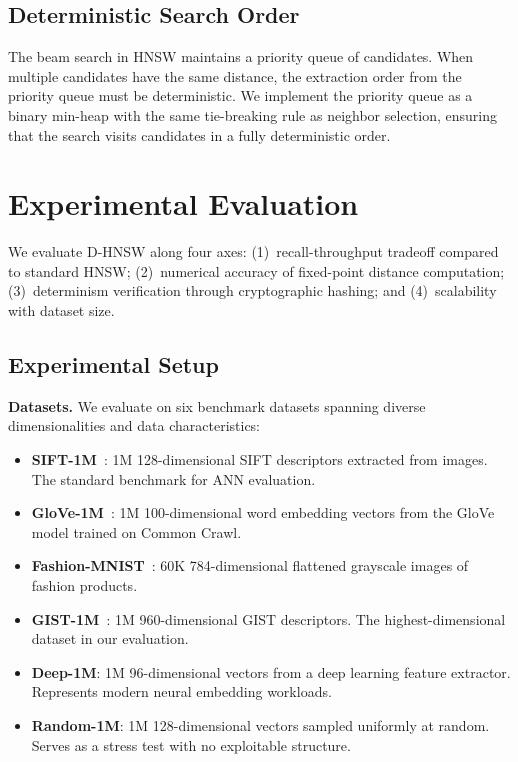 \documentclass[10pt,journal,compsoc]{IEEEtran}
\newcommand{\dhnsw}{\textsc{D-HNSW}}
\newcommand{\hnsw}{\textsc{HNSW}}
\begin{document}
\subsection{Deterministic Search Order}

The beam search in \hnsw{} maintains a priority queue of candidates. When multiple candidates have the same distance, the extraction order from the priority queue must be deterministic. We implement the priority queue as a binary min-heap with the same tie-breaking rule as neighbor selection, ensuring that the search visits candidates in a fully deterministic order.


\section{Experimental Evaluation}
\label{sec:experiments}

We evaluate \dhnsw{} along four axes: (1)~recall-throughput tradeoff compared to standard \hnsw{}; (2)~numerical accuracy of fixed-point distance computation; (3)~determinism verification through cryptographic hashing; and (4)~scalability with dataset size.

\subsection{Experimental Setup}

\textbf{Datasets.} We evaluate on six benchmark datasets spanning diverse dimensionalities and data characteristics:

\begin{itemize}[leftmargin=*]
  \item \textbf{SIFT-1M}~\cite{jegou2011sift}: 1M 128-dimensional SIFT descriptors extracted from images. The standard benchmark for ANN evaluation.
  \item \textbf{GloVe-1M}~\cite{pennington2014glove}: 1M 100-dimensional word embedding vectors from the GloVe model trained on Common Crawl.
  \item \textbf{Fashion-MNIST}~\cite{xiao2017fashion}: 60K 784-dimensional flattened grayscale images of fashion products.
  \item \textbf{GIST-1M}~\cite{oliva2001gist}: 1M 960-dimensional GIST descriptors. The highest-dimensional dataset in our evaluation.
  \item \textbf{Deep-1M}: 1M 96-dimensional vectors from a deep learning feature extractor. Represents modern neural embedding workloads.
  \item \textbf{Random-1M}: 1M 128-dimensional vectors sampled uniformly at random. Serves as a stress test with no exploitable structure.
\end{itemize}
\end{document}
